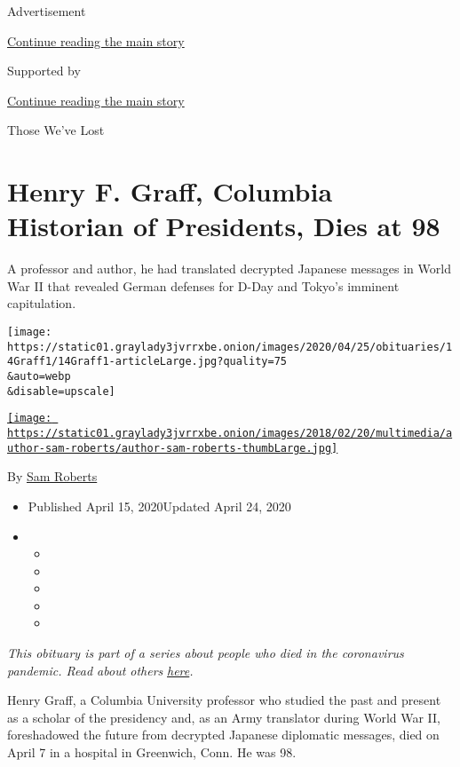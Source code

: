 Advertisement

\protect\hyperlink{after-top}{Continue reading the main story}

Supported by

\protect\hyperlink{after-sponsor}{Continue reading the main story}

Those We've Lost

\hypertarget{henry-f-graff-columbia-historian-of-presidents-dies-at-98}{%
\section{Henry F. Graff, Columbia Historian of Presidents, Dies at
98}\label{henry-f-graff-columbia-historian-of-presidents-dies-at-98}}

A professor and author, he had translated decrypted Japanese messages in
World War II that revealed German defenses for D-Day and Tokyo's
imminent capitulation.

\texttt{[image: https://static01.graylady3jvrrxbe.onion/images/2020/04/25/obituaries/14Graff1/14Graff1-articleLarge.jpg?quality=75\\\&auto=webp\\\&disable=upscale]}

\href{https://www.nytimes3xbfgragh.onion/by/sam-roberts}{\texttt{[image: https://static01.graylady3jvrrxbe.onion/images/2018/02/20/multimedia/author-sam-roberts/author-sam-roberts-thumbLarge.jpg]}}

By \href{https://www.nytimes3xbfgragh.onion/by/sam-roberts}{Sam Roberts}

\begin{itemize}
\item
  Published April 15, 2020Updated April 24, 2020
\item
  \begin{itemize}
  \item
  \item
  \item
  \item
  \item
  \end{itemize}
\end{itemize}

\emph{This obituary is part of a series about people who died in the
coronavirus pandemic. Read about others}
\href{https://www.nytimes3xbfgragh.onion/series/people-who-have-died-of-the-coronavirus}{\emph{here}}\emph{.}

Henry Graff, a Columbia University professor who studied the past and
present as a scholar of the presidency and, as an Army translator during
World War II, foreshadowed the future from decrypted Japanese diplomatic
messages, died on April 7 in a hospital in Greenwich, Conn. He was 98.


